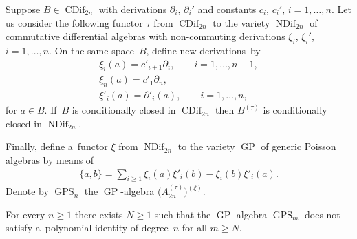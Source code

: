 Suppose $B\in \operatorname{CDif}_{2n}$ with derivations $\partial_i$, $\partial_i'$ and constants $c_i$, $c_i'$, $i=1,\dots, n$.
Let us consider the following functor $\tau $ from $\operatorname{CDif}_{2n}$ to the variety $\operatorname{NDif}_{2n}$ of commutative dif\/ferential
algebras with non-commuting derivations $\xi_i$, $\xi_i'$, $i=1,\dots, n$.
On the same space~$B$, def\/ine new derivations~by
\begin{gather*}
\xi_i(a) = c'_{i+1}\partial_i,
\qquad
i=1,\dots, n-1,
\\
\xi_n(a) = c'_1\partial_n,
\\
\xi'_i(a) = \partial'_i(a),
\qquad
i=1,\dots, n,
\end{gather*}
for $a\in B$.
If~$B$ is conditionally closed in $\operatorname{CDif}_{2n}$ then $B^{(\tau)}$ is conditionally closed in $\operatorname{NDif}_{2n}$.

Finally, def\/ine a~functor $\xi $ from $\operatorname{NDif}_{2n}$ to the variety $\operatorname{GP}$ of generic Poisson algebras by means of
\begin{gather*}
\{a,b\} = \sum\limits_{i\ge 1} \xi_i(a)\xi'_i(b) - \xi_i(b)\xi'_i(a).
\end{gather*}
Denote by $\operatorname{GPS}_n$ the $\operatorname{GP}$-algebra $\big(A_{2n}^{(\tau)} \big)^{(\xi)}$.

\begin{proposition}
\label{prop:NonPIGPS}
For every $n\ge 1$ there exists $N\ge 1$ such that the $\operatorname{GP}$-algebra $\operatorname{GPS}_{m}$ does not satisfy a~polynomial identity of
degree~$n$ for all $m\ge N$.
\end{proposition}

